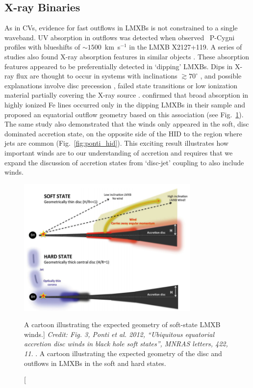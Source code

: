 \subsection{X-ray Binaries}
\label{sec:xrb_winds}

As in CVs, evidence for fast outflows in LMXBs is not constrained to 
a single waveband. UV absorption in outflows was detected when
\cite{ioannau2003} observed \civfull\ P-Cygni profiles with blueshifts 
of $\sim1500$~km~s$^{-1}$ in the LMXB X2127+119. 
A series of studies also found X-ray absorption features in similar objects 
\citep{ueda1998,kotani2000,parmar2002}. 
These absorption features appeared to be preferentially detected
in `dipping' LMXBs. Dips in X-ray flux are thought to occur
in systems with inclinations $\gtrsim70^\circ$ 
\citep{vanderhooft1998,tanaka2003,church2005}, and possible explanations
involve disc precession \citep{barnard2006,shaw2013},  
failed state transitions \citep{soleri2013,shaw2016} or low ionization material 
partially covering the X-ray source \citep{tanaka2003}.
\cite{ponti2012} confirmed that broad absorption in highly ionized Fe lines 
occurred only in the dipping LMXBs in their sample and proposed an equatorial 
outflow geometry based on this association (see Fig.~\ref{fig:ponti_cartoon}). 
The same study also demonstrated that the winds only appeared in the soft, 
disc dominated accretion state, on the opposite side of the HID to the
region where jets are common (Fig.~\ref{fig:ponti_hid}). 
This exciting result illustrates how
important winds are to our understanding of accretion and requires that
we expand the discussion of accretion states from `disc-jet' coupling
to also include winds.

\begin{figure}
\centering
\includegraphics[width=0.8\textwidth]{figures/01-intro/ponti_wind_cartoon.png}
\caption
[A cartoon illustrating the expected geometry of soft-state LMXB winds.]
{
{\sl Credit: Fig. 3, Ponti et al. 2012, ``Ubiquitous equatorial accretion disc winds in black hole soft states'', MNRAS letters, 422, 11.
}. 
A cartoon illustrating the expected geometry of the disc and outflows in
LMXBs in the soft and hard states.
} 
\label{fig:ponti_cartoon}
\end{figure}


